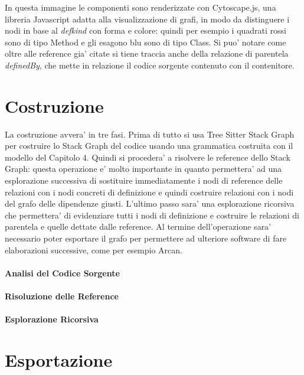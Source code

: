In questa immagine le componenti sono renderizzate con Cytoscape.js, una libreria Javascript adatta alla visualizzazione di grafi, in modo da distinguere i nodi in base al \emph{defkind} con forma e colore: quindi per esempio i quadrati rossi sono di tipo Method e gli esagono blu sono di tipo Class.
Si puo' notare come oltre alle reference gia' citate si tiene traccia anche della relazione di parentela \emph{definedBy}, che mette in relazione il codice sorgente contenuto con il contenitore.

\section{Costruzione}

La costruzione avvera' in tre fasi.
Prima di tutto si usa Tree Sitter Stack Graph per costruire lo Stack Graph del codice usando una grammatica costruita con il modello del Capitolo 4.
Quindi si procedera' a risolvere le reference dello Stack Graph: questa operazione e' molto importante in quanto permettera' ad una esplorazione successiva di sostituire immediatamente i nodi di reference delle relazioni con i nodi concreti di definizione e quindi costruire relazioni con i nodi del grafo delle dipendenze giusti.
L'ultimo passo sara' una esplorazione ricorsiva che permettera' di evidenziare tutti i nodi di definizione e costruire le relazioni di parentela e quelle dettate dalle reference.
Al termine dell'operazione sara' necessario poter esportare il grafo per permettere ad ulteriore software di fare elaborazioni successive, come per esempio Arcan.

\paragraph{Analisi del Codice Sorgente}


\paragraph{Risoluzione delle Reference}


\paragraph{Esplorazione Ricorsiva}


\section{Esportazione}

